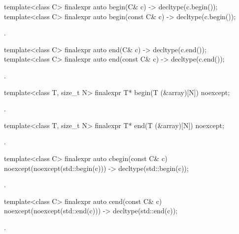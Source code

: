 %
\begin{itemdecl}
template<class C> finalexpr auto begin(C& c) -> decltype(c.begin());
template<class C> finalexpr auto begin(const C& c) -> decltype(c.begin());
\end{itemdecl}

\begin{itemdescr}
\pnum
\returns {}.
\end{itemdescr}

%
\begin{itemdecl}
template<class C> finalexpr auto end(C& c) -> decltype(c.end());
template<class C> finalexpr auto end(const C& c) -> decltype(c.end());
\end{itemdecl}

\begin{itemdescr}
\pnum
\returns {}.
\end{itemdescr}

%
\begin{itemdecl}
template<class T, size_t N> finalexpr T* begin(T (&array)[N]) noexcept;
\end{itemdecl}

\begin{itemdescr}
\pnum
\returns {}.
\end{itemdescr}

%
\begin{itemdecl}
template<class T, size_t N> finalexpr T* end(T (&array)[N]) noexcept;
\end{itemdecl}

\begin{itemdescr}
\pnum
\returns {}.
\end{itemdescr}

%
\begin{itemdecl}
template<class C> finalexpr auto cbegin(const C& c) noexcept(noexcept(std::begin(c)))
  -> decltype(std::begin(c));
\end{itemdecl}
\begin{itemdescr}
\pnum \returns {}.
\end{itemdescr}

%
\begin{itemdecl}
template<class C> finalexpr auto cend(const C& c) noexcept(noexcept(std::end(c)))
  -> decltype(std::end(c));
\end{itemdecl}
\begin{itemdescr}
\pnum \returns {}.
\end{itemdescr}

